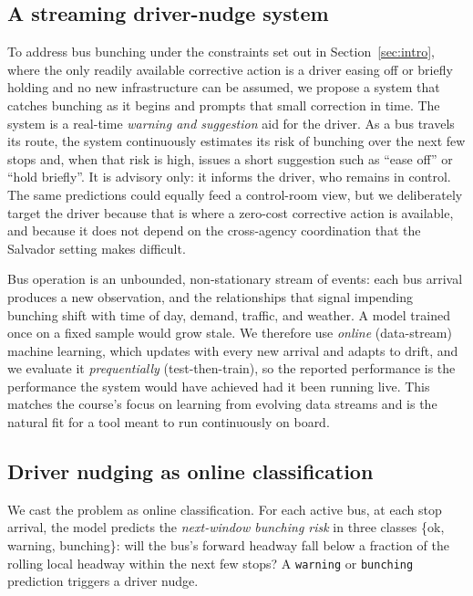 \documentclass[11pt,a4paper]{article}
\begin{document}
\subsection{A streaming driver-nudge system}
\label{sec:system}

To address bus bunching under the constraints set out in Section~\ref{sec:intro}, where the only
readily available corrective action is a driver easing off or briefly holding and no new
infrastructure can be assumed, we propose a system that catches bunching as it begins and prompts
that small correction in time. The system is a real-time \emph{warning and suggestion} aid for the
driver. As a bus travels its route, the system continuously estimates its risk of bunching over the
next few stops and, when that risk is high, issues a short suggestion such as ``ease off'' or ``hold
briefly''. It is advisory only: it informs the driver, who remains in control. The same predictions
could equally feed a control-room view, but we deliberately target the driver because that is where a
zero-cost corrective action is available, and because it does not depend on the cross-agency
coordination that the Salvador setting makes difficult.

Bus operation is an unbounded, non-stationary stream of events: each bus arrival produces a new
observation, and the relationships that signal impending bunching shift with time of day, demand,
traffic, and weather. A model trained once on a fixed sample would grow stale. We therefore use
\emph{online} (data-stream) machine learning, which updates with every new arrival and adapts to
drift, and we evaluate it \emph{prequentially} (test-then-train), so the reported performance is
the performance the system would have achieved had it been running live. This matches the course's
focus on learning from evolving data streams and is the natural fit for a tool meant to run
continuously on board.

\subsection{Driver nudging as online classification}
\label{sec:nudge-task}

We cast the problem as online classification. For each active bus, at each stop arrival, the model
predicts the \emph{next-window bunching risk} in three classes \{ok, warning, bunching\}: will the
bus's forward headway fall below a fraction of the rolling local headway within the next few stops?
A \texttt{warning} or \texttt{bunching} prediction triggers a driver nudge.
\end{document}
